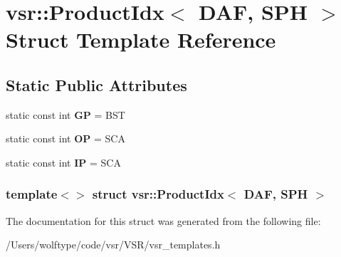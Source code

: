 \hypertarget{structvsr_1_1_product_idx_3_01_d_a_f_00_01_s_p_h_01_4}{\section{vsr\-:\-:Product\-Idx$<$ D\-A\-F, S\-P\-H $>$ Struct Template Reference}
\label{structvsr_1_1_product_idx_3_01_d_a_f_00_01_s_p_h_01_4}
}
\subsection*{Static Public Attributes}
\begin{DoxyCompactItemize}
\item 
\hypertarget{structvsr_1_1_product_idx_3_01_d_a_f_00_01_s_p_h_01_4_a5c6ed70af87f8e978be0cff7e57dc7f8}{static const int {\bfseries G\-P} = B\-S\-T}\label{structvsr_1_1_product_idx_3_01_d_a_f_00_01_s_p_h_01_4_a5c6ed70af87f8e978be0cff7e57dc7f8}

\item 
\hypertarget{structvsr_1_1_product_idx_3_01_d_a_f_00_01_s_p_h_01_4_ad756423aa5607e95951dafb449500e0e}{static const int {\bfseries O\-P} = S\-C\-A}\label{structvsr_1_1_product_idx_3_01_d_a_f_00_01_s_p_h_01_4_ad756423aa5607e95951dafb449500e0e}

\item 
\hypertarget{structvsr_1_1_product_idx_3_01_d_a_f_00_01_s_p_h_01_4_ac88bba08c90700c4a9d8eacc477685ec}{static const int {\bfseries I\-P} = S\-C\-A}\label{structvsr_1_1_product_idx_3_01_d_a_f_00_01_s_p_h_01_4_ac88bba08c90700c4a9d8eacc477685ec}

\end{DoxyCompactItemize}
\subsubsection*{template$<$$>$ struct vsr\-::\-Product\-Idx$<$ D\-A\-F, S\-P\-H $>$}



The documentation for this struct was generated from the following file\-:\begin{DoxyCompactItemize}
\item 
/\-Users/wolftype/code/vsr/\-V\-S\-R/vsr\-\_\-templates.\-h\end{DoxyCompactItemize}
